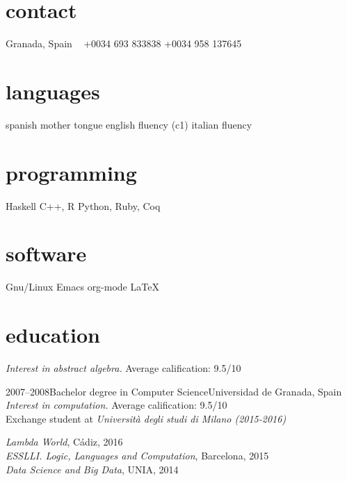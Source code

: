 \documentclass[print]{friggeri-cv-a4}
\begin{document}

\begin{aside} %
\section{contact}
Granada,
Spain
~
+0034 693 833838
+0034 958 137645
~
\section{languages}
spanish mother tongue
english fluency (c1)
italian fluency
\section{programming}
Haskell
C++, R
Python, Ruby, Coq
\section{software}
Gnu/Linux
Emacs org-mode
LaTeX
\end{aside}


\section{education}

\begin{entrylist}


{\emph{Interest in abstract algebra.} Average calification: 9.5/10
}

\entry
{2007--2008}{{\normalfont Bachelor degree in} Computer Science}{Universidad de Granada, Spain}
{\emph{Interest in computation.} Average calification: 9.5/10 \\
Exchange student at \emph{Università degli studi di Milano (2015-2016)}
} 

{ \emph{Lambda World}, Cádiz, 2016 \\
  \emph{ESSLLI. Logic, Languages and Computation}, Barcelona, 2015 \\
  \emph{Data Science and Big Data}, UNIA, 2014
}

\end{entrylist}
\end{document}
